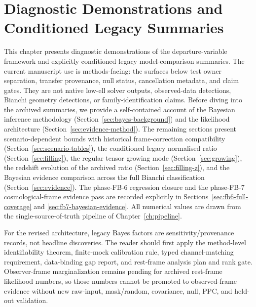
\chapter{Diagnostic Demonstrations and Conditioned Legacy Summaries}\label{ch:results}

This chapter presents diagnostic demonstrations of the
departure-variable framework and explicitly conditioned legacy
model-comparison summaries.  The current manuscript use is
methods-facing: the surfaces below test owner separation,
transfer provenance, null status, cancellation metadata, and
claim gates.  They are not native low-ell solver outputs,
observed-data detections, Bianchi geometry detections, or
family-identification claims.  Before diving into the archived
summaries, we provide a self-contained account of the Bayesian inference
methodology (Section~\ref{sec:bayes-background}) and the
likelihood architecture (Section~\ref{sec:evidence-method}).
The remaining sections present scenario-dependent bounds with
historical frame-correction compatibility
(Section~\ref{sec:scenario-tables}), the conditioned legacy
normalised ratio (Section~\ref{sec:filling}), the regular
tensor growing mode (Section~\ref{sec:growing}), the redshift
evolution of the archived ratio
(Section~\ref{sec:filling-z}), and the Bayesian evidence
comparison across the full Bianchi classification
(Section~\ref{sec:evidence}).  The phase-FB-6 regression closure and
the phase-FB-7 cosmological-frame evidence pass are recorded
explicitly in Sections~\ref{sec:fb6-full-coverage} and
\ref{sec:fb7-bayesian-evidence}.  All numerical values are drawn
from the single-source-of-truth pipeline of
Chapter~\ref{ch:pipeline}.

For the revised architecture, legacy Bayes factors are
sensitivity/provenance records, not headline discoveries.  The
reader should first apply the method-level identifiability
theorem, finite-mock calibration rule, typed channel-matching
requirement, data-binding gap report, and rest-frame analysis
plan and rank gate.  Observer-frame marginalization remains
pending for archived rest-frame likelihood numbers, so those
numbers cannot be promoted to observed-frame evidence without
new raw-input, mask/random, covariance, null, PPC, and held-out
validation.


